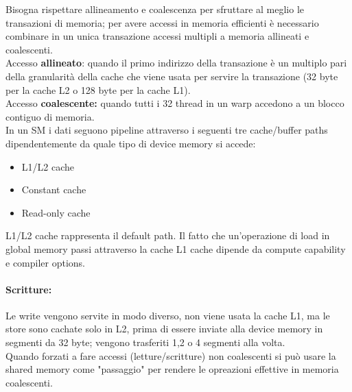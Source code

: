 Bisogna rispettare allineamento e coalescenza per sfruttare al meglio le transazioni di memoria; per avere accessi in memoria efficienti è necessario combinare in un unica transazione accessi multipli a memoria allineati e coalescenti.\\

Accesso \textbf{allineato}: quando il primo indirizzo della transazione è un multiplo pari della granularità della cache che viene usata per servire la transazione (32 byte per la cache L2 o 128 byte per la cache L1).\\
Accesso \textbf{coalescente:} quando tutti i 32 thread in un warp accedono a un blocco contiguo di memoria.\\

In un SM i dati seguono pipeline attraverso i seguenti tre cache/buffer paths dipendentemente da quale tipo di device memory si accede:
\begin{itemize}
	\item L1/L2 cache
	\item Constant cache
	\item Read-only cache
\end{itemize}

L1/L2 cache rappresenta il default path. Il fatto che un'operazione di load in global memory passi attraverso la cache L1 cache dipende da compute capability e compiler options.\\

\paragraph{Scritture:} Le write vengono servite in modo diverso, non viene usata la cache L1, ma le store sono cachate solo in L2, prima di essere inviate alla device memory in segmenti da 32  byte; vengono trasferiti 1,2 o 4 segmenti alla volta.\\

Quando forzati a fare accessi (letture/scritture) non coalescenti si può usare la shared memory come "passaggio" per rendere le opreazioni effettive in memoria coalescenti.\\ 

%
